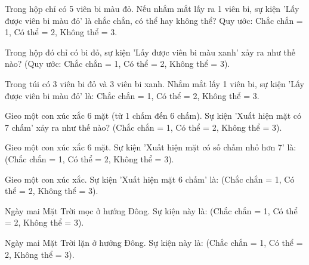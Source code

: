 \begin{ex}
Trong hộp chỉ có 5 viên bi màu đỏ. Nếu nhắm mắt lấy ra 1 viên bi, sự kiện 'Lấy được viên bi màu đỏ' là chắc chắn, có thể hay không thể? Quy ước: Chắc chắn = 1, Có thể = 2, Không thể = 3.
\end{ex}

\begin{ex}
Trong hộp đó chỉ có bi đỏ, sự kiện 'Lấy được viên bi màu xanh' xảy ra như thế nào? (Quy ước: Chắc chắn = 1, Có thể = 2, Không thể = 3).
\end{ex}

\begin{ex}
Trong túi có 3 viên bi đỏ và 3 viên bi xanh. Nhắm mắt lấy 1 viên bi, sự kiện 'Lấy được viên bi màu đỏ' là: Chắc chắn = 1, Có thể = 2, Không thể = 3.
\end{ex}

\begin{ex}
Gieo một con xúc xắc 6 mặt (từ 1 chấm đến 6 chấm). Sự kiện 'Xuất hiện mặt có 7 chấm' xảy ra như thế nào? (Chắc chắn = 1, Có thể = 2, Không thể = 3).
\end{ex}

\begin{ex}
Gieo một con xúc xắc 6 mặt. Sự kiện 'Xuất hiện mặt có số chấm nhỏ hơn 7' là: (Chắc chắn = 1, Có thể = 2, Không thể = 3).
\end{ex}

\begin{ex}
Gieo một con xúc xắc. Sự kiện 'Xuất hiện mặt 6 chấm' là: (Chắc chắn = 1, Có thể = 2, Không thể = 3).
\end{ex}

\begin{ex}
Ngày mai Mặt Trời mọc ở hướng Đông. Sự kiện này là: (Chắc chắn = 1, Có thể = 2, Không thể = 3).
\end{ex}

\begin{ex}
Ngày mai Mặt Trời lặn ở hướng Đông. Sự kiện này là: (Chắc chắn = 1, Có thể = 2, Không thể = 3).
\end{ex}

